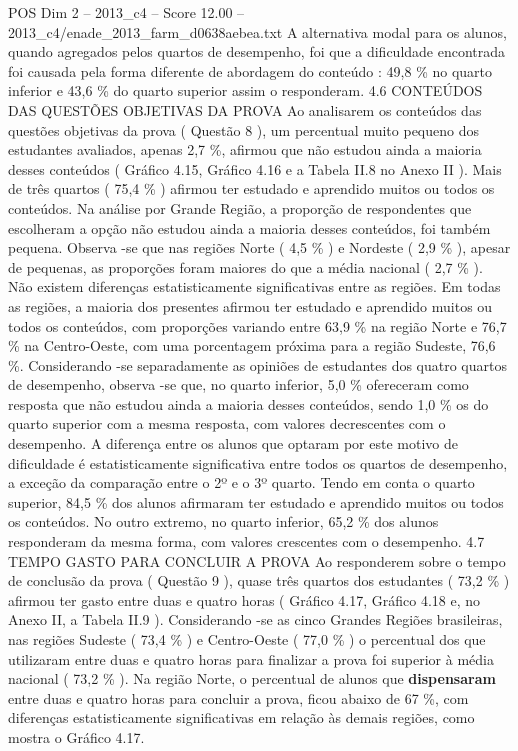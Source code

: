 \begin{textsample}{POS Dim 2 – 2013\_c4 – Score 12.00 – 2013\_c4/enade\_2013\_farm\_d0638aebea.txt}
A alternativa modal para os alunos, quando agregados pelos quartos de desempenho, foi que a dificuldade encontrada foi causada pela forma diferente de abordagem do conteúdo : 49,8 \% no quarto inferior e 43,6 \% do quarto superior assim o responderam. 4.6 CONTEÚDOS DAS QUESTÕES OBJETIVAS DA PROVA Ao analisarem os conteúdos das questões objetivas da prova ( Questão 8 ), um percentual muito pequeno dos estudantes avaliados, apenas 2,7 \%, afirmou que não estudou ainda a maioria desses conteúdos ( Gráfico 4.15, Gráfico 4.16 e a Tabela II.8 no Anexo II ).
Mais de três quartos ( 75,4 \% ) afirmou ter estudado e aprendido muitos ou todos os conteúdos.
Na análise por Grande Região, a proporção de respondentes que escolheram a opção não estudou ainda a maioria desses conteúdos, foi também pequena.
Observa -se que nas regiões Norte ( 4,5 \% ) e Nordeste ( 2,9 \% ), apesar de pequenas, as proporções foram maiores do que a média nacional ( 2,7 \% ).
Não existem diferenças estatisticamente significativas entre as regiões.
Em todas as regiões, a maioria dos presentes afirmou ter estudado e aprendido muitos ou todos os conteúdos, com proporções variando entre 63,9 \% na região Norte e 76,7 \% na Centro-Oeste, com uma porcentagem próxima para a região Sudeste, 76,6 \%.
Considerando -se separadamente as opiniões de estudantes dos quatro quartos de desempenho, observa -se que, no quarto inferior, 5,0 \% ofereceram como resposta que não estudou ainda a maioria desses conteúdos, sendo 1,0 \% os do quarto superior com a mesma resposta, com valores decrescentes com o desempenho.
A diferença entre os alunos que optaram por este motivo de dificuldade é estatisticamente significativa entre todos os quartos de desempenho, a exceção da comparação entre o 2º e o 3º quarto.
Tendo em conta o quarto superior, 84,5 \% dos alunos afirmaram ter estudado e aprendido muitos ou todos os conteúdos.
No outro extremo, no quarto inferior, 65,2 \% dos alunos responderam da mesma forma, com valores crescentes com o desempenho. 4.7 TEMPO GASTO PARA CONCLUIR A PROVA Ao responderem sobre o tempo de conclusão da prova ( Questão 9 ), quase três quartos dos estudantes ( 73,2 \% ) afirmou ter gasto entre duas e quatro horas ( Gráfico 4.17, Gráfico 4.18 e, no Anexo II, a Tabela II.9 ).
Considerando -se as cinco Grandes Regiões brasileiras, nas regiões Sudeste ( 73,4 \% ) e Centro-Oeste ( 77,0 \% ) o percentual dos que utilizaram entre duas e quatro horas para finalizar a prova foi superior à média nacional ( 73,2 \% ).
Na região Norte, o percentual de alunos que \textbf{dispensaram} entre duas e quatro horas para concluir a prova, ficou abaixo de 67 \%, com diferenças estatisticamente significativas em relação às demais regiões, como mostra o Gráfico 4.17.

\end{textsample}
